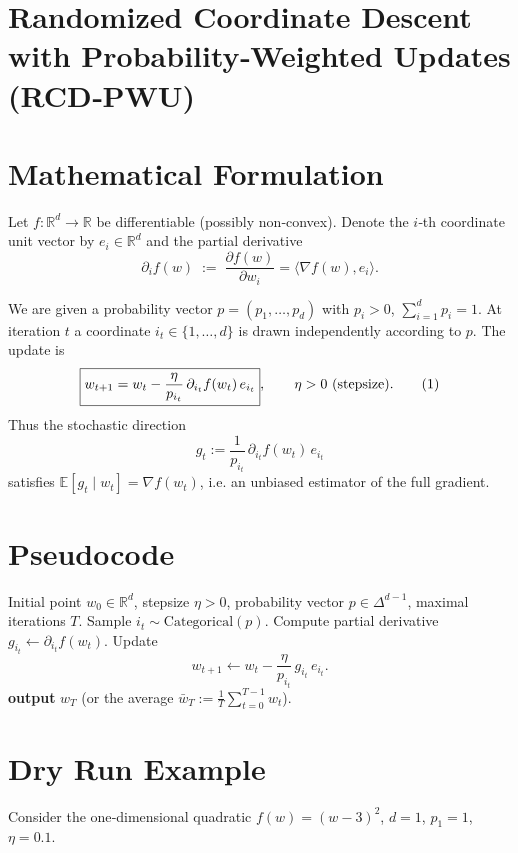 \documentclass{article}
\begin{document}
\section*{Randomized Coordinate Descent with Probability‑Weighted Updates (RCD‑PWU)}

\section*{Mathematical Formulation}
Let $f:\mathbb{R}^{d}\rightarrow\mathbb{R}$ be differentiable (possibly non‑convex).  
Denote the $i$‑th coordinate unit vector by $e_i\in\mathbb{R}^{d}$ and the partial derivative
\[
\partial_i f(w)\;:=\;\frac{\partial f(w)}{\partial w_i}= \langle\nabla f(w),e_i\rangle .
\]

We are given a probability vector $p=(p_1,\dots ,p_d)$ with $p_i>0$, $\sum_{i=1}^{d}p_i=1$.
At iteration $t$ a coordinate $i_t\in\{1,\dots ,d\}$ is drawn independently
according to $p$.  The update is
\[
\boxed{%
w_{t+1}= w_{t}-\frac{\eta}{p_{i_t}}\,\partial_{i_t} f(w_t)\,e_{i_t}},\qquad 
\eta>0\text{ (stepsize).}
\tag{1}
\]
Thus the stochastic direction
\[
g_t:=\frac{1}{p_{i_t}}\,\partial_{i_t} f(w_t)\,e_{i_t}
\]
satisfies $\mathbb{E}[g_t\mid w_t]=\nabla f(w_t)$, i.e. an unbiased estimator of the full gradient.

\section*{Pseudocode}
\begin{algorithm}[H]
\caption{Randomized Coordinate Descent with Probability‑Weighted Updates}
\begin{algorithmic}[1]
\Require Initial point $w_0\in\mathbb{R}^{d}$, stepsize $\eta>0$, probability vector $p\in\Delta^{d-1}$, maximal iterations $T$.
    \State Sample $i_t\sim\text{Categorical}(p)$.
    \State Compute partial derivative $g_{i_t}\gets\partial_{i_t} f(w_t)$.
    \State Update 
    \[
    w_{t+1}\gets w_t-\frac{\eta}{p_{i_t}}\,g_{i_t}\,e_{i_t}.
    \]
\EndFor
\State \textbf{output} $w_T$ (or the average $\bar w_T:=\frac1T\sum_{t=0}^{T-1} w_t$).
\end{algorithmic}
\end{algorithm}

\section*{Dry Run Example}
Consider the one‑dimensional quadratic $f(w)=(w-3)^2$, $d=1$, $p_1=1$, $\eta=0.1$.
\end{document}
